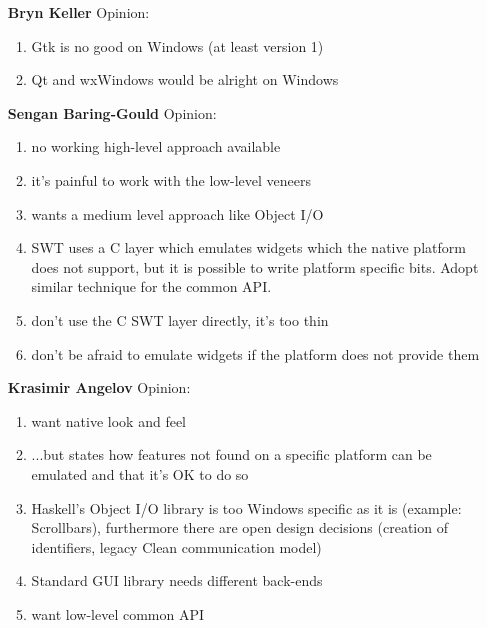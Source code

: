 \documentclass{article}
\newcommand{\Party}[1]{\stepcounter{enumi}\arabic{enumi} \bf #1}
\begin{document}
\begin{enumerate}
\item[\Party{Bryn Keller}] Opinion:
  \begin{enumerate}
  \item \label{feelbk} Gtk is no good on Windows (at least version 1)
  \item Qt and wxWindows would be alright on Windows
  \end{enumerate}

\item[\Party{Sengan Baring-Gould}] Opinion:
  \begin{enumerate}
  \item \label{highsbg} no working high-level approach available
  \item \label{lowsbg} it's painful to work with the low-level veneers
  \item \label{midsbg}wants a medium level approach like Object I/O
  \item SWT uses a C layer which emulates widgets which the native
    platform does not support, but it is possible to write platform
    specific bits. Adopt similar technique for the common API.
  \item don't use the C SWT layer directly, it's too thin
  \item \label{dirtysbg} don't be afraid to emulate widgets if the
    platform does not provide them
  \end{enumerate}

\item[\Party{Krasimir Angelov}] Opinion:
  \begin{enumerate}
  \item \label{lookka} want native look and feel
  \item \label{dirtyka} ...but states how features not found on a
    specific platform can be emulated and that it's OK to do so
  \item \label{portka} Haskell's Object I/O library is too Windows
    specific as it is (example: Scrollbars), furthermore there are
    open design decisions (creation of identifiers, legacy Clean
    communication model)
  \item Standard GUI library needs different back-ends
  \item \label{lowka} want low-level common API
  \end{enumerate}


\end{enumerate}
\end{document}
